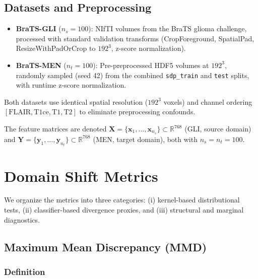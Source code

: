 \documentclass[11pt,a4paper]{article}
\newcommand{\R}{\mathbb{R}}
\theoremstyle{definition}
\begin{document}
\subsection{Datasets and Preprocessing}

\begin{itemize}[nosep]
  \item \textbf{BraTS-GLI} ($n_s = 100$): NIfTI volumes from the BraTS glioma challenge, processed with standard validation transforms (CropForeground, SpatialPad, ResizeWithPadOrCrop to $192^3$, z-score normalization).
  \item \textbf{BraTS-MEN} ($n_t = 100$): Pre-preprocessed HDF5 volumes at $192^3$, randomly sampled (seed 42) from the combined \texttt{sdp\_train} and \texttt{test} splits, with runtime z-score normalization.
\end{itemize}

Both datasets use identical spatial resolution ($192^3$ voxels) and channel ordering $[\text{FLAIR}, \text{T1ce}, \text{T1}, \text{T2}]$ to eliminate preprocessing confounds.

The feature matrices are denoted $\bm{X} = \{\bm{x}_1, \ldots, \bm{x}_{n_s}\} \subset \R^{768}$ (GLI, source domain) and $\bm{Y} = \{\bm{y}_1, \ldots, \bm{y}_{n_t}\} \subset \R^{768}$ (MEN, target domain), both with $n_s = n_t = 100$.


\section{Domain Shift Metrics}\label{sec:metrics}

We organize the metrics into three categories: (i) kernel-based distributional tests, (ii) classifier-based divergence proxies, and (iii) structural and marginal diagnostics.

\subsection{Maximum Mean Discrepancy (MMD)}\label{sec:mmd}

\subsubsection{Definition}
\end{document}
